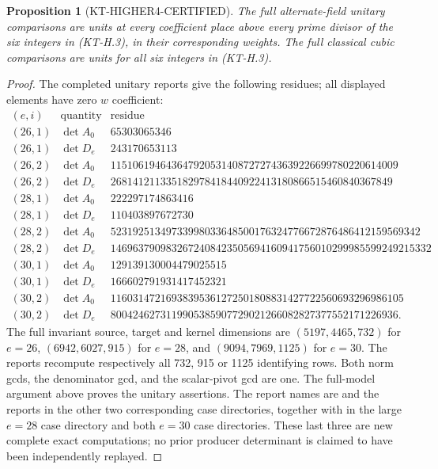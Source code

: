 \documentclass[11pt,a4paper]{article}
\newtheorem{proposition}[theorem]{Proposition}
\theoremstyle{definition}
\begin{document}
\begin{proposition}[KT-HIGHER4-CERTIFIED]
The full alternate-field unitary comparisons are units at every
coefficient place above every prime divisor of the six
integers in (KT-H.3), in their corresponding weights.
The full classical cubic comparisons are units for all six
integers in (KT-H.3).
\end{proposition}
\begin{proof}
The completed unitary reports give the following residues;
all displayed elements have zero $w$ coefficient:
\[
\begin{array}{c|c|r}
(e,i)&\text{quantity}&\text{residue}\\\hline
(26,1)&\det A_0&65303065346\\
(26,1)&\det D_e&243170653113\\
(26,2)&\det A_0&1151061946436479205314087272743639226699780220614009\\
(26,2)&\det D_e&268141211335182978418440922413180866515460840367849\\
(28,1)&\det A_0&222297174863416\\
(28,1)&\det D_e&110403897672730\\
(28,2)&\det A_0&52319251349733998033648500176324776672876486412159569342\\
(28,2)&\det D_e&1469637909832672408423505694160941756010299985599249215332\\
(30,1)&\det A_0&129139130004479025515\\
(30,1)&\det D_e&166602791931417452321\\
(30,2)&\det A_0&11603147216938395361272501808831427722560693296986105\\
(30,2)&\det D_e&8004246273119905385907729021266082827377552171226936.
\end{array}                                             \tag{KT-H.4}
\]
The full invariant source, target and kernel dimensions are
$(5197,4465,732)$ for $e=26$, $(6942,6027,915)$ for $e=28$,
and $(9094,7969,1125)$ for $e=30$.
The reports recompute respectively all 732, 915 or 1125 identifying
rows.  Both norm gcds, the denominator gcd, and the scalar-pivot
gcd are one.  The full-model argument above proves the unitary
assertions.  The report names are
 and the
 reports in the other
two corresponding case directories, together with
 in the large $e=28$ case directory
and both $e=30$ case directories.  These last three are new
complete exact computations; no prior producer determinant is
claimed to have been independently replayed.


\end{proof}
\end{document}
